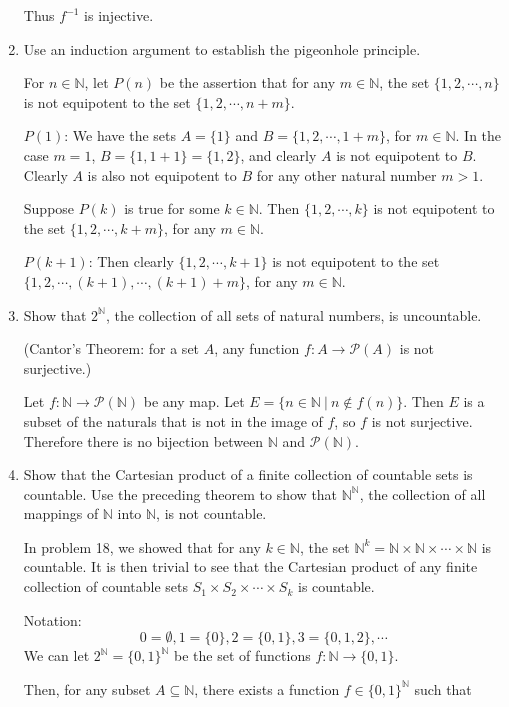 \begin{enumerate}
	Thus $f^{-1}$ is injective.   
	\item Use an induction argument to establish the pigeonhole principle.\par
	For $n \in \mathbb{N}$, let $P(n)$ be the assertion that for any $m \in \mathbb{N}$, the set $\{1,2, \cdots, n\}$ is not equipotent to the set $\{1,2, \cdots, n+m\}$.\par
	$P(1)$: We have the sets $A=\{1\}$ and $B=\{1,2, \cdots, 1+m\}$, for $m \in \mathbb{N}$.
	In the case $m=1$, $B=\{1,1+1\}=\{1,2\}$, and clearly $A$ is not equipotent to $B$. Clearly $A$ is also not equipotent to $B$ for any other natural number $m>1$.\par
	Suppose $P(k)$ is true for some $k \in \mathbb{N}$. Then $\{1,2, \cdots, k\}$ is not equipotent to the set $\{1,2, \cdots, k+m\}$, for any $m \in \mathbb{N}$.\par
	$P(k+1)$: Then clearly $\{1,2, \cdots, k+1\}$ is not equipotent to the set $\{1,2, \cdots, (k+1), \cdots, (k+1)+m\}$, for any $m \in \mathbb{N}$.
	\item Show that $2^{\mathbb{N}}$, the collection of all sets of natural numbers, is uncountable.\par
	(Cantor's Theorem: for a set $A$, any function $f:A\to \mathcal{P}(A)$ is not surjective.)\par
	Let $f:\mathbb{N}\to \mathcal{P}(\mathbb{N})$ be any map. Let $E = \{n \in \mathbb{N}\ | \ n \notin f(n) \}$. 
	Then $E$ is a subset of the naturals that is not in the image of $f$, so $f$ is not surjective. 
	Therefore there is no bijection between $\mathbb{N}$ and  $\mathcal{P}(\mathbb{N})$.
	\item Show that the Cartesian product of a finite collection of countable sets is countable. Use the preceding theorem to show that $\mathbb{N}^{\mathbb{N}}$, the collection of all mappings of $\mathbb{N}$ into $\mathbb{N}$, is not countable.\par
	In problem 18, we showed that for any $k \in \mathbb{N}$, the set $\mathbb{N}^k = \mathbb{N} \times \mathbb{N} \times \cdots \times \mathbb{N}$ is countable. 
	It is then trivial to see that the Cartesian product of any finite collection of countable sets $S_1 \times S_2 \times \cdots \times S_k$ is countable.\par
	Notation:
	\[
		0=\emptyset, 1= \{0\}, 2=\{0,1\}, 3 = \{0,1,2\}, \cdots
	\]
	We can let $2^{\mathbb{N}}= \{0,1\}^{\mathbb{N}}$ be the set of functions $f:\mathbb{N} \to \{0,1\}$.\par
	Then, for any subset $A \subseteq \mathbb{N}$, there exists a function $f \in \{0,1\}^{\mathbb{N}}$ such that 

\end{enumerate}
